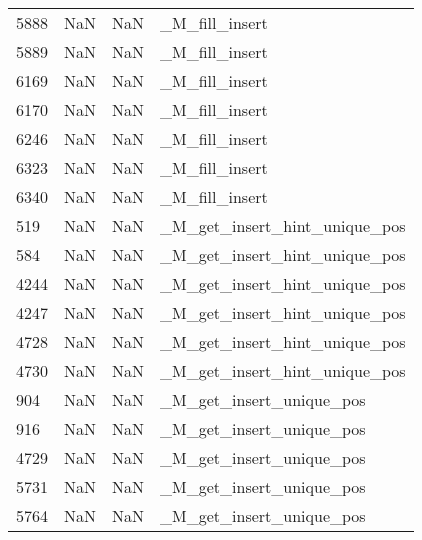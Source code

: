 \begin{tabular}{llll}
5888 &                   NaN &                        NaN &                            \_M\_fill\_insert \\
5889 &                   NaN &                        NaN &                            \_M\_fill\_insert \\
6169 &                   NaN &                        NaN &                            \_M\_fill\_insert \\
6170 &                   NaN &                        NaN &                            \_M\_fill\_insert \\
6246 &                   NaN &                        NaN &                            \_M\_fill\_insert \\
6323 &                   NaN &                        NaN &                            \_M\_fill\_insert \\
6340 &                   NaN &                        NaN &                            \_M\_fill\_insert \\
519  &                   NaN &                        NaN &             \_M\_get\_insert\_hint\_unique\_pos \\
584  &                   NaN &                        NaN &             \_M\_get\_insert\_hint\_unique\_pos \\
4244 &                   NaN &                        NaN &             \_M\_get\_insert\_hint\_unique\_pos \\
4247 &                   NaN &                        NaN &             \_M\_get\_insert\_hint\_unique\_pos \\
4728 &                   NaN &                        NaN &             \_M\_get\_insert\_hint\_unique\_pos \\
4730 &                   NaN &                        NaN &             \_M\_get\_insert\_hint\_unique\_pos \\
904  &                   NaN &                        NaN &                  \_M\_get\_insert\_unique\_pos \\
916  &                   NaN &                        NaN &                  \_M\_get\_insert\_unique\_pos \\
4729 &                   NaN &                        NaN &                  \_M\_get\_insert\_unique\_pos \\
5731 &                   NaN &                        NaN &                  \_M\_get\_insert\_unique\_pos \\
5764 &                   NaN &                        NaN &                  \_M\_get\_insert\_unique\_pos \\

\end{tabular}
